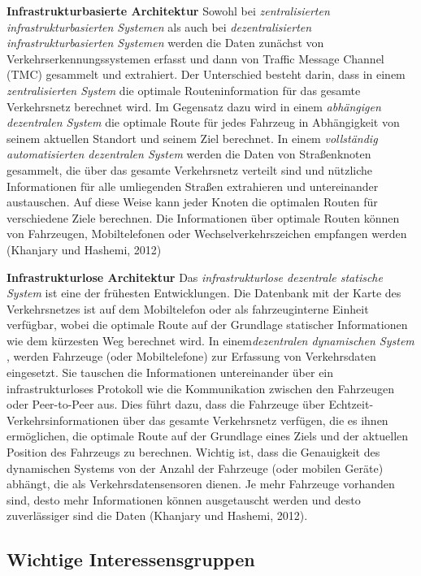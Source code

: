 \documentclass[
]{book}
\begin{document}
\textbf{Infrastrukturbasierte Architektur}
Sowohl bei \emph{zentralisierten infrastrukturbasierten Systemen} als auch bei \emph{dezentralisierten infrastrukturbasierten Systemen} werden die Daten zunächst von Verkehrserkennungssystemen erfasst und dann von Traffic Message Channel (TMC) gesammelt und extrahiert. Der Unterschied besteht darin, dass in einem \emph{zentralisierten System } die optimale Routeninformation für das gesamte Verkehrsnetz berechnet wird. Im Gegensatz dazu wird in einem \emph{abhängigen dezentralen System } die optimale Route für jedes Fahrzeug in Abhängigkeit von seinem aktuellen Standort und seinem Ziel berechnet. In einem \emph{vollständig automatisierten dezentralen System} werden die Daten von Straßenknoten gesammelt, die über das gesamte Verkehrsnetz verteilt sind und nützliche Informationen für alle umliegenden Straßen extrahieren und untereinander austauschen. Auf diese Weise kann jeder Knoten die optimalen Routen für verschiedene Ziele berechnen. Die Informationen über optimale Routen können von Fahrzeugen, Mobiltelefonen oder Wechselverkehrszeichen empfangen werden (Khanjary und Hashemi, 2012)

\textbf{Infrastrukturlose Architektur}
Das \emph{infrastrukturlose dezentrale statische System } ist eine der frühesten Entwicklungen. Die Datenbank mit der Karte des Verkehrsnetzes ist auf dem Mobiltelefon oder als fahrzeuginterne Einheit verfügbar, wobei die optimale Route auf der Grundlage statischer Informationen wie dem kürzesten Weg berechnet wird. In einem\emph{dezentralen dynamischen System }, werden Fahrzeuge (oder Mobiltelefone) zur Erfassung von Verkehrsdaten eingesetzt. Sie tauschen die Informationen untereinander über ein infrastrukturloses Protokoll wie die Kommunikation zwischen den Fahrzeugen oder Peer-to-Peer aus. Dies führt dazu, dass die Fahrzeuge über Echtzeit-Verkehrsinformationen über das gesamte Verkehrsnetz verfügen, die es ihnen ermöglichen, die optimale Route auf der Grundlage eines Ziels und der aktuellen Position des Fahrzeugs zu berechnen. Wichtig ist, dass die Genauigkeit des dynamischen Systems von der Anzahl der Fahrzeuge (oder mobilen Geräte) abhängt, die als Verkehrsdatensensoren dienen. Je mehr Fahrzeuge vorhanden sind, desto mehr Informationen können ausgetauscht werden und desto zuverlässiger sind die Daten (Khanjary und Hashemi, 2012).

\hypertarget{wichtige-interessensgruppen-13}{%
\subsection*{Wichtige Interessensgruppen}\label{wichtige-interessensgruppen-13}}
\end{document}
